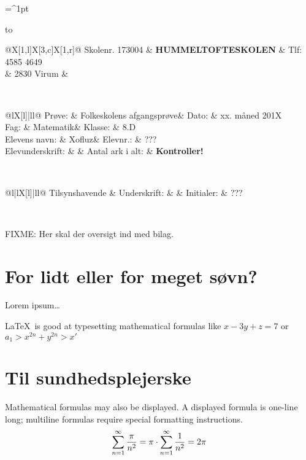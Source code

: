 \documentclass[a4,12pt]{article}
\makeatletter
\newcommand{\skoleklasse}{8.D}
\newcommand{\proevetype}{Folkeskolens afgangsprøve}
\newcommand{\proevefag}{Matematik}
\newcommand{\elevnavn}{Xofluz}
\newcommand{\elevnummer}{???}
\newcommand{\tilsynshavende}{???}
\newcommand{\eksamensdato}{xx. måned 201X}
\newcommand{\antalarkialt}{\pageref{LastPage} \textbf{Kontroller!}}
\newcommand{\eksamensforsideboks}{
\noindent
\tabulinesep=^1pt
\begin{tabu} to  \textwidth {|X[c]|}
  \hline
  \begin{tabu} {@{}X[1,l]X[3,c]X[1,r]@{}}
    Skolenr. 173004 & {\large \textbf{HUMMELTOFTESKOLEN}} & Tlf: 4585 4649 \\
  & 2830 Virum & \\
  \end{tabu} \\
  \hline
  \begin{tabu} {@{}lX[l]|ll@{}}
    Prøve: & \proevetype & Dato: & \eksamensdato \\
    Fag: & \proevefag & Klasse: & \skoleklasse \\
    Elevens navn: & \elevnavn & Elevnr.: & \elevnummer \\
    Elevunderskrift: & & Antal ark i alt: & \antalarkialt \\[0.5cm]
  \end{tabu} \\
  \hline
  \begin{tabu} {@{}l|lX[l]|ll@{}}
    Tilsynshavende & Underskrift: & & Initialer: & \tilsynshavende \\[0.5cm]
  \end{tabu} \\
  \hline
\end{tabu}
\vspace{1cm}
}
\makeatother
\begin{document}
\thispagestyle{plain}
\eksamensforsideboks


FIXME: Her skal der oversigt ind med bilag.

\section{For lidt eller for meget søvn?}

Lorem ipsum\ldots

\LaTeX\ is good at typesetting mathematical formulas
like
       \( x-3y + z = 7 \) 
or
       \( a_{1} > x^{2n} + y^{2n} > x' \)

\section{Til sundhedsplejerske}
Mathematical formulas may also be displayed.
A displayed formula is one-line long; multiline
formulas require special formatting instructions.
\[
  \sum\limits_{n=1}^\infty{\pi \over n^2} = \pi \cdot \sum\limits_{n=1}^\infty{1 \over n^2} = 2\pi
\]

\end{document}
